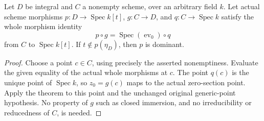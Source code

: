 \begin{corollary}
\label{scheme:polynomial-dominance-central-fibre}
\leanok
{}
Let \(D\) be integral and \(C\) a nonempty scheme, over an arbitrary field \(k\).
Let actual scheme morphisms \(p:D\to\operatorname{Spec}k[t]\),
\(g:C\to D\), and \(q:C\to\operatorname{Spec}k\) satisfy the whole morphism identity
\[
 p\circ g=\operatorname{Spec}(\operatorname{ev}_0)\circ q
\]
from \(C\) to \(\operatorname{Spec}k[t]\).
If \(t\notin p(\eta_D)\), then \(p\) is dominant.
\end{corollary}
\begin{proof}
Choose a point \(c\in C\), using precisely the asserted nonemptiness.
Evaluate the given equality of the actual whole morphisms at \(c\).
The point \(q(c)\) is the unique point of \(\operatorname{Spec}k\), so
\(z_0=g(c)\) maps to the actual zero-section point. Apply the theorem to this
point and the unchanged original generic-point hypothesis.
No property of \(g\) such as closed immersion, and no irreducibility or
reducedness of \(C\), is needed.
\end{proof}

